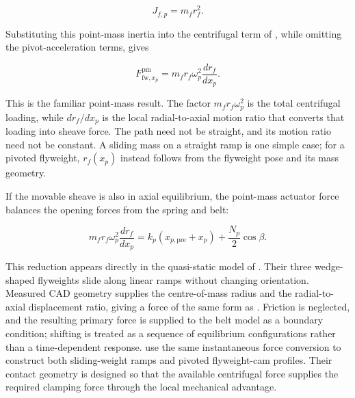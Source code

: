 \documentclass[11pt]{report}
\numberwithin{equation}{section}
\begin{document}
\begin{equation}
    J_{f,p}
    =
    m_f r_f^2.
    \label{eq:primary_flyweight_lumped_inertia}
\end{equation}

Substituting this point-mass inertia into the centrifugal term of
, while omitting the pivot-acceleration
terms, gives

\begin{equation}
    F_{\mathrm{fw},x_p}^{\mathrm{pm}}
    =
    m_f r_f\omega_p^2
    \frac{dr_f}{dx_p}.
    \label{eq:primary_flyweight_point_mass_limit}
\end{equation}

This is the familiar point-mass result. The factor
\(m_f r_f\omega_p^2\) is the total centrifugal loading, while
\(dr_f/dx_p\) is the local radial-to-axial motion ratio that converts that
loading into sheave force. The path need not be straight, and its motion ratio
need not be constant. A sliding mass on a straight ramp is one simple case;
for a pivoted flyweight, \(r_f(x_p)\) instead follows from the flyweight pose
and its mass geometry.

If the movable sheave is also in axial equilibrium, the point-mass actuator
force balances the opening forces from the spring and belt:

\begin{equation}
    m_f r_f\omega_p^2
    \frac{dr_f}{dx_p}
    =
    k_p\left(x_{p,\mathrm{pre}}+x_p\right)
    +
    \frac{N_p}{2}\cos\beta.
    \label{eq:primary_classical_equilibrium}
\end{equation}

This reduction appears directly in the quasi-static model of
\citet{Messick2018}. Their three wedge-shaped flyweights slide along linear
ramps without changing orientation. Measured CAD geometry supplies the
centre-of-mass radius and the radial-to-axial displacement ratio, giving a
force of the same form as
. Friction is neglected, and the
resulting primary force is supplied to the belt model as a boundary condition;
shifting is treated as a sequence of equilibrium configurations rather than a
time-dependent response. \citet{ArangoMunoz2020} use the same
instantaneous force conversion to construct both sliding-weight ramps and
pivoted flyweight-cam profiles. Their contact geometry is designed so that
the available centrifugal force supplies the required clamping force through
the local mechanical advantage.
\end{document}
